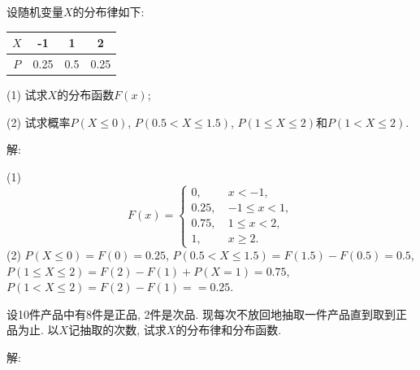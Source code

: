 \documentclass[standard]{ExBook}
\renewenvironment{shaded}{%
  \def\FrameCommand{\fboxsep=\FrameSep \colorbox{shadecolor}}%
  \MakeFramed{\advance\hsize-\width \FrameRestore}%
}{%
  \endMakeFramed
}
\begin{document}
\begin{qitems}
\vspace{2.5cm-5em}

    \begin{bbox}
    \begin{shaded}
        \qitem
设随机变量$X$的分布律如下: 
\begin{center}
\setlength{\tabcolsep}{30pt}
\begin{tabular}{c|ccc}
$X$ & -1 & 1 & 2\\
\hline
$P$ & 0.25 & 0.5 & 0.25\\
\end{tabular}
\end{center}
(1) 试求$X$的分布函数$F(x)$;

(2) 试求概率$P(X \leq 0)$, $P(0.5 < X  \leq 1.5)$, $P(1 \leq X \leq 2)$和$P(1 < X \leq 2)$.
    \end{shaded}
    \end{bbox}

\vspace{\dimexpr2.5cm-5em\relax}

解: 

(1)
$$
    F(x)=
    \left\{
    \begin{array}{ll}
        0,\ &x < -1,\\
        0.25,\ &-1 \leq x < 1,\\
        0.75,\ &1 \leq x < 2,\\
        1,\ &x \geq 2.
    \end{array}
    \right.
$$
(2) $P(X \leq 0)=F(0)=0.25$, $P(0.5 < X  \leq 1.5)=F(1.5)-F(0.5)=0.5$, $P(1 \leq X \leq 2)=F(2)-F(1)+P(X=1)=0.75$, $P(1 < X \leq 2)=F(2)-F(1)==0.25$.

\vspace{2.5cm-5em}

    \begin{bbox}
    \begin{shaded}
        \qitem
设10件产品中有8件是正品, 2件是次品. 现每次不放回地抽取一件产品直到取到正品为止. 以$X$记抽取的次数, 试求$X$的分布律和分布函数.
    \end{shaded}
    \end{bbox}

\vspace{\dimexpr2.5cm-5em\relax}

解: 


\end{qitems}
\end{document}
